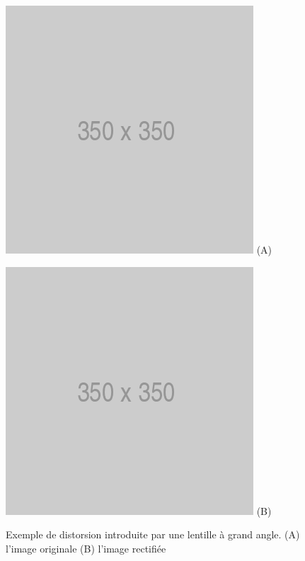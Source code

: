 \begin{figure}[htp]
  \centering
  \begin{minipage}{0.4\textwidth}
    \centering
    \includegraphics[width=\linewidth]{images/placeholder.png}
    (A)
  \end{minipage}
  \begin{minipage}{0.4\textwidth}
    \centering
    \includegraphics[width=\linewidth]{images/placeholder.png}
    (B)
  \end{minipage}
  \caption{Exemple de distorsion introduite par une lentille à grand angle. (A) l'image originale (B) l'image rectifiée}
  \label{fig:distortion}
\end{figure}


